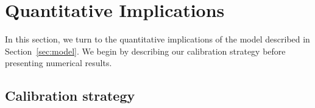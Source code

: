 
\section{Quantitative Implications}

In this section, we turn to the quantitative implications of the model described in Section~\ref{sec:model}. We begin by describing our calibration strategy before presenting numerical results.  

\subsection{Calibration strategy}

